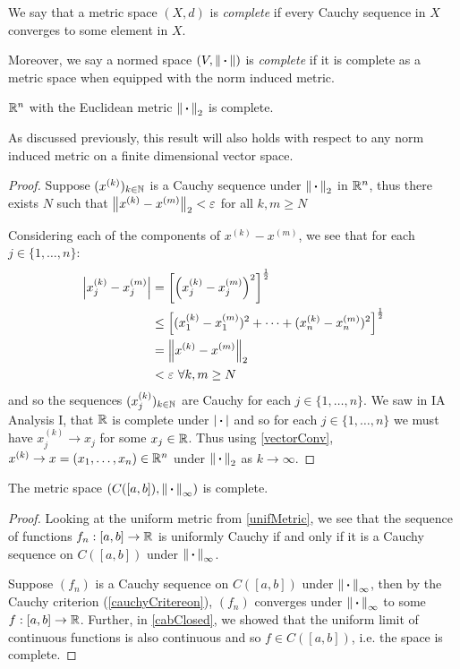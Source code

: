 \documentclass[../main.tex]{subfiles}
\begin{document}
\begin{definition}[Completeness]
  We say that a metric space $(X, d)$ is \textit{complete} if every Cauchy sequence in $X$ converges to some element in $X$.

  Moreover, we say a normed space $(V, \left\lVert {\hspace{0.18em}\boldsymbol{\cdot}\hspace{0.18em}} \right\rVert)$ is \textit{complete} if it is complete as a metric space when equipped with the norm induced metric.
\end{definition}
\begin{theorem}[Completeness of $\R^n$]
  $\R^n$ with the Euclidean metric $\left\lVert {\hspace{0.18em}\boldsymbol{\cdot}\hspace{0.18em}} \right\rVert_2$ is complete. \label{RnComp}
\end{theorem}
\begin{remark}
  As discussed previously, this result will also holds with respect to any norm induced metric on a finite dimensional vector space.
\end{remark}
\begin{proof}
  Suppose $(x^{(k)})_{k \in \mathbb{N}}$ is a Cauchy sequence under $\left\lVert {\hspace{0.18em}\boldsymbol{\cdot}\hspace{0.18em}} \right\rVert_2$ in $\R^n$, thus there exists $N$ such that $\left\lVert x^{(k)} - x^{(m)} \right\rVert_2 < \varepsilon$ for all $k, m \geq N$

  Considering each of the components of $x^{(k)} - x^{(m)}$, we see that for each $j \in \{1, \ldots, n\}$:
  \begin{align*}
    \left\lvert x^{(k)}_j - x^{(m)}_j \right\rvert &= \left[\left(x^{(k)}_j - x^{(m)}_j\right)^2\right]^{\frac{1}{2}} \\
                                &\leq \left[(x^{(k)}_1 - x^{(m)}_1)^2 + \cdots + (x^{(k)}_n - x^{(m)}_n)^2\right]^{\frac{1}{2}} \\
                                &= \left\lVert x^{(k)} - x^{(m)} \right\rVert_{2} \\
                                &< \varepsilon\ \forall k, m \geq N
  \end{align*}
  and so the sequences $(x^{(k)}_j)_{k \in \mathbb{N}}$ are Cauchy for each $j \in \{1, \ldots, n\}$.
  We saw in IA Analysis I, that $\mathbb{R}$ is complete under $|{\hspace{0.18em}\boldsymbol{\cdot}\hspace{0.18em}}|$ and so for each $j \in \{1, \ldots, n\}$ we must have $x^{(k)}_j \to x_j$ for some $x_j \in \mathbb{R}$.
  Thus using \cref{vectorConv}, $x^{(k)} \to x = (x_1, \ldots, x_n) \in \mathbb{R}^{n}$ under $\left\lVert {\hspace{0.18em}\boldsymbol{\cdot}\hspace{0.18em}} \right\rVert_2$ as $k \to \infty$.
\end{proof}
\begin{theorem}
  The metric space $(C([a, b]), \left\lVert {\hspace{0.18em}\boldsymbol{\cdot}\hspace{0.18em}} \right\rVert_{\infty})$ is complete. \label{CInfComp}
\end{theorem}
\begin{proof}
  Looking at the uniform metric from \cref{unifMetric}, we see that the sequence of functions $f_n: [a, b] \to \mathbb{R}$ is uniformly Cauchy if and only if it is a Cauchy sequence on $C([a, b])$ under $\left\lVert {\hspace{0.18em}\boldsymbol{\cdot}\hspace{0.18em}} \right\rVert_{\infty}$.

  Suppose $(f_n)$ is a Cauchy sequence on $C([a, b])$ under $\left\lVert {\hspace{0.18em}\boldsymbol{\cdot}\hspace{0.18em}} \right\rVert_{\infty}$, then by the Cauchy criterion (\cref{cauchyCritereon}), $(f_n)$ converges under $\left\lVert {\hspace{0.18em}\boldsymbol{\cdot}\hspace{0.18em}} \right\rVert_{\infty}$ to some $f: [a, b] \to \mathbb{R}$.
  Further, in \cref{cabClosed}, we showed that the uniform limit of continuous functions is also continuous and so $f \in C([a, b])$, i.e. the space is complete.
\end{proof}
\end{document}
